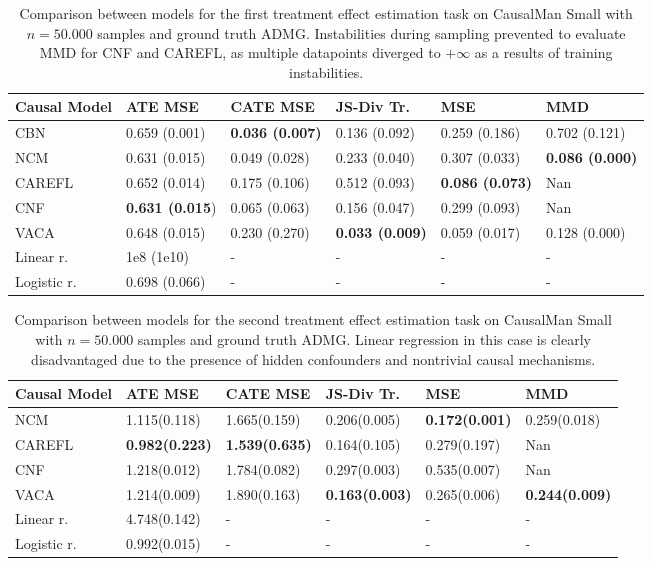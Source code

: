 \begin{table*}[h] 
\centering
\begin{tabular}{ p{1.5cm}|p{1.9cm}|p{1.9cm}|p{1.9cm}|p{1.9cm}|p{1.9cm} }
 Causal Model & ATE MSE & CATE MSE & JS-Div Tr. & MSE & MMD\\
 \hline
 CBN   & 0.659 (0.001)  & \textbf{0.036 (0.007)} & 0.136 (0.092) & 0.259 (0.186) &  0.702 (0.121) \\
 NCM   & 0.631 (0.015)   & 0.049 (0.028) & 0.233 (0.040) & 0.307 (0.033) &  \textbf{0.086 (0.000)} \\
 CAREFL & 0.652 (0.014) & 0.175 (0.106) & 0.512 (0.093) & \textbf{0.086 (0.073)} &  Nan \\
 CNF   &\textbf{0.631 (0.015})   & 0.065 (0.063) & 0.156 (0.047) & 0.299 (0.093) &  Nan \\
 VACA  & 0.648 (0.015)   & 0.230 (0.270) & \textbf{0.033 (0.009)} & 0.059 (0.017) &   0.128 (0.000) \\
 Linear r. & 1e8 (1e10)   & - & - & -  &  -\\
 Logistic r.& 0.698 (0.066)   & - & - & -  &  -\\
\end{tabular}
\caption{Comparison between models for the first treatment effect estimation task on CausalMan Small with $n = 50.000$ samples and ground truth ADMG. Instabilities during sampling prevented to evaluate MMD for CNF and CAREFL, as multiple datapoints diverged to $+\infty$ as a results of training instabilities.}
\label{table:effect_estimation_small_results_2}
\end{table*}


\begin{table*}[h] 
\centering
\begin{tabular}{ p{1.5cm}|p{1.9cm}|p{1.9cm}|p{1.9cm}|p{1.9cm}|p{1.9cm} }
 Causal Model & ATE MSE & CATE MSE & JS-Div Tr. & MSE & MMD\\
 \hline
 NCM   & 1.115(0.118) & 1.665(0.159) & 0.206(0.005) & \textbf{0.172(0.001)} &  0.259(0.018) \\
 CAREFL & \textbf{0.982(0.223)} & \textbf{1.539(0.635)} & 0.164(0.105) & 0.279(0.197) &  Nan \\
 CNF   & 1.218(0.012) & 1.784(0.082) & 0.297(0.003) & 0.535(0.007) &  Nan \\
 VACA  & 1.214(0.009)   & 1.890(0.163) &\textbf{ 0.163(0.003)} & 0.265(0.006) &   \textbf{0.244(0.009)} \\
 Linear r. & 4.748(0.142)   & - & - & -  &  -\\
 Logistic r.& 0.992(0.015)   & - & - & -  &  -\\
\end{tabular}
\caption{Comparison between models for the second treatment effect estimation task on CausalMan Small with $n = 50.000$ samples and ground truth ADMG. Linear regression in this case is clearly disadvantaged due to the presence of hidden confounders and nontrivial causal mechanisms.}\label{table:effect_estimation_small_results_3_annex}
\end{table*}


